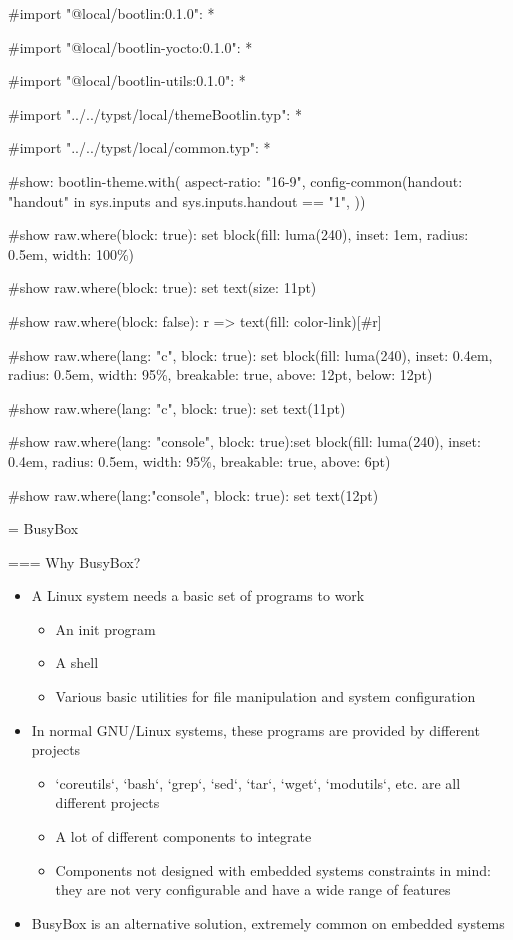 #import "@local/bootlin:0.1.0": *

#import "@local/bootlin-yocto:0.1.0": *

#import "@local/bootlin-utils:0.1.0": *

#import "../../typst/local/themeBootlin.typ": *

#import "../../typst/local/common.typ": *

#show: bootlin-theme.with( aspect-ratio: "16-9", config-common(handout: "handout" in sys.inputs and sys.inputs.handout == "1", ))

#show raw.where(block: true): set block(fill: luma(240), inset: 1em, radius: 0.5em, width: 100\%)

#show raw.where(block: true): set text(size: 11pt)

#show raw.where(block: false): r => text(fill: color-link)[#r]

#show raw.where(lang: "c", block: true): set block(fill: luma(240), inset: 0.4em, radius: 0.5em, width: 95\%, breakable: true, above: 12pt, below: 12pt)

#show raw.where(lang: "c", block: true): set text(11pt)

#show raw.where(lang: "console", block: true):set block(fill: luma(240), inset: 0.4em, radius: 0.5em, width: 95\%, breakable: true, above: 6pt)

#show raw.where(lang:"console", block: true): set text(12pt)

 = BusyBox

=== Why BusyBox?
  \begin{itemize}
  \item A Linux system needs a basic set of programs to work
    \begin{itemize}
    \item An init program
    \item A shell
    \item Various basic utilities for file manipulation and system
      configuration
    \end{itemize}
  \item In normal GNU/Linux systems, these programs are provided by
    different projects
    \begin{itemize}
    \item `coreutils`, `bash`, `grep`, `sed`,
      `tar`, `wget`, `modutils`, etc. are all different
      projects
    \item A lot of different components to integrate
    \item Components not designed with embedded systems constraints in
      mind: they are not very configurable and have a wide range of
      features
    \end{itemize}
  \item BusyBox is an alternative solution, extremely common on
    embedded systems
  \end{itemize}


